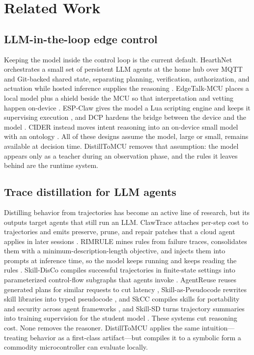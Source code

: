 \documentclass[11pt,a4paper]{article}
\begin{document}
\section{Related Work}

\subsection{LLM-in-the-loop edge control}

Keeping the model inside the control loop is the current default. HearthNet
orchestrates a small set of persistent LLM agents at the home hub over MQTT
and Git-backed shared state, separating planning, verification, authorization,
and actuation while hosted inference supplies the reasoning \cite{1}.
EdgeTalk-MCU places a local model plus a shield beside the MCU so that
interpretation and vetting happen on-device \cite{2}. ESP-Claw gives the model
a Lua scripting engine and keeps it supervising execution \cite{3}, and DCP
hardens the bridge between the device and the model \cite{4}. CIDER instead
moves intent reasoning into an on-device small model with an ontology
\cite{13}. All of these designs assume the model, large or small, remains
available at decision time. DistillToMCU removes that assumption: the model
appears only as a teacher during an observation phase, and the rules it
leaves behind are the runtime system.

\subsection{Trace distillation for LLM agents}

Distilling behavior from trajectories has become an active line of research,
but its
outputs target agents that still run an LLM. ClawTrace attaches per-step cost
to trajectories and emits preserve, prune, and repair patches that a cloud
agent applies in later sessions \cite{5}. RIMRULE mines rules from failure
traces, consolidates them with a minimum-description-length objective, and
injects them into prompts at inference time, so the model keeps running and
keeps reading the rules \cite{6}. Skill-DisCo compiles successful trajectories
in finite-state settings into parameterized control-flow subgraphs that
agents invoke \cite{7}. AgentReuse reuses generated plans for similar requests
to cut latency \cite{8}, Skill-as-Pseudocode rewrites skill libraries into
typed pseudocode \cite{9}, and SkCC compiles skills for portability and
security across agent frameworks \cite{10}, and Skill-SD turns trajectory
summaries into training supervision for the student model \cite{14}. These
systems cut reasoning cost. None removes the reasoner. DistillToMCU
applies the same intuition---treating behavior as a first-class artifact---but
compiles it to a symbolic form a commodity microcontroller can evaluate
locally.
\end{document}
